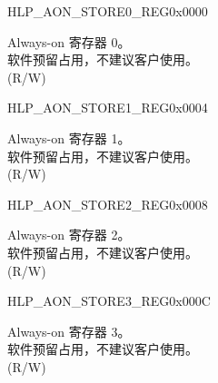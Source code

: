 \begin{register}{H}{LP\_AON\_STORE0\_REG}{0x0000}\label{regdesc:LPAONSTORE0REG}
%
\regnewline%
\begin{regdesc}\begin{reglist}
\label{fielddesc:LPAONLPAONSTORE0}\item [LP\_AON\_LP\_AON\_STORE0] Always-on 寄存器 0。\\
软件预留占用，不建议客户使用。\\
(R/W)
\end{reglist}\end{regdesc}
\end{register}

\begin{register}{H}{LP\_AON\_STORE1\_REG}{0x0004}\label{regdesc:LPAONSTORE1REG}
%
\regnewline%
\begin{regdesc}\begin{reglist}
\label{fielddesc:LPAONLPAONSTORE1}\item [LP\_AON\_LP\_AON\_STORE1] Always-on 寄存器 1。\\
软件预留占用，不建议客户使用。\\
(R/W)
\end{reglist}\end{regdesc}
\end{register}

\begin{register}{H}{LP\_AON\_STORE2\_REG}{0x0008}\label{regdesc:LPAONSTORE2REG}
%
\regnewline%
\begin{regdesc}\begin{reglist}
\label{fielddesc:LPAONLPAONSTORE2}\item [LP\_AON\_LP\_AON\_STORE2] Always-on 寄存器 2。\\
软件预留占用，不建议客户使用。\\
(R/W)
\end{reglist}\end{regdesc}
\end{register}

\begin{register}{H}{LP\_AON\_STORE3\_REG}{0x000C}\label{regdesc:LPAONSTORE3REG}
%
\regnewline%
\begin{regdesc}\begin{reglist}
\label{fielddesc:LPAONLPAONSTORE3}\item [LP\_AON\_LP\_AON\_STORE3] Always-on 寄存器 3。\\
软件预留占用，不建议客户使用。\\
(R/W)
\end{reglist}\end{regdesc}
\end{register}

